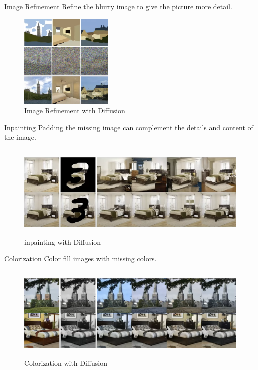 \documentclass[aspectratio=169]{beamer}
\begin{document}
\begin{frame}{Image Refinement}
    Refine the blurry image to give the picture more detail.
    \begin{figure}
        \centering
        \includegraphics[height=4.5cm]{../pic/compose.png}
        \caption{Image Refinement with Diffusion}
    \end{figure}
\end{frame}
\begin{frame}{Inpainting}
    Padding the missing image can complement the details and content of the image.
    \begin{figure}
        \centering
        \includegraphics[height=4.5cm]{../pic/inpainting.png}
        \caption{inpainting with Diffusion}
    \end{figure}
\end{frame}
\begin{frame}{Colorization}
    Color fill images with missing colors.
    \begin{figure}
        \centering
        \includegraphics[height=4.5cm]{../pic/colorization.png}
        \caption{Colorization with Diffusion}
    \end{figure}
\end{frame}
\end{document}
